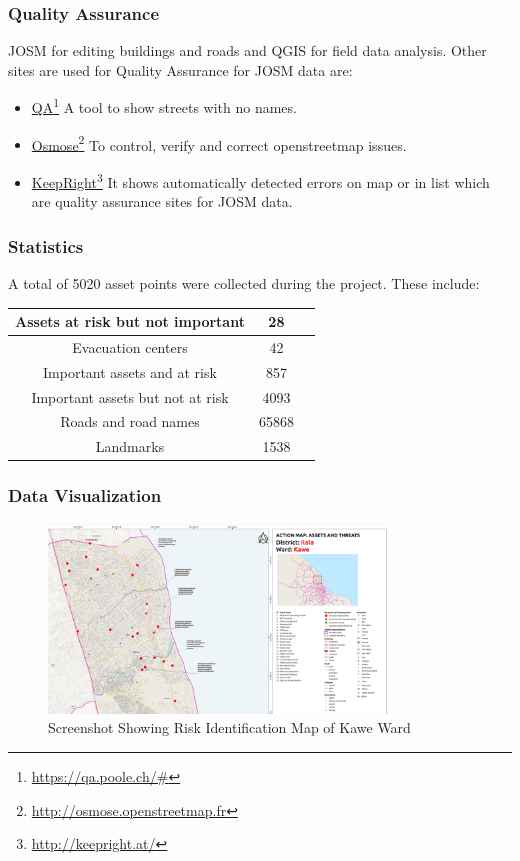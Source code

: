 \documentclass[a4paper,12pt,twoside]{article}
\begin{document}
\subsubsection{Quality Assurance}
JOSM for editing buildings and roads and QGIS for field data analysis. Other sites are used for Quality Assurance for JOSM data are:
\begin{itemize}
    \item \href{https://qa.poole.ch/\#}{QA}\footnote{\url{https://qa.poole.ch/\#}}
    A tool to show streets with no names.

    \item \href{http://osmose.openstreetmap.fr}{Osmose}\footnote{\url{http://osmose.openstreetmap.fr}}
    To  control, verify and correct openstreetmap issues.

    \item \href{http://keepright.at/}{KeepRight}\footnote{\url{http://keepright.at/}}
    It shows automatically detected errors on map or in  list    which are quality assurance sites for JOSM data.

\end{itemize}

\subsubsection{Statistics}
A total of 5020 asset points were collected during the project. These include:
\begin{center}
\begin{tabular}{ |c|c|c| }
 \hline
 Assets at risk but not important & 28 \\ 
 \hline
 Evacuation centers & 42 \\ 
 \hline
 Important assets and at risk & 857 \\
 \hline
 Important assets but not at risk & 4093 \\
 \hline
 Roads and road names & 65868 \\
 \hline
 Landmarks & 1538 \\
 \hline
\end{tabular}
\end{center}

\subsubsection{Data Visualization}
\begin{figure}[h]
{\color{RHgreen}\caption{Screenshot Showing Risk Identification Map of Kawe Ward }}
 \centering
  \includegraphics[width=0.8\textwidth]{images/Asset_and_Threat_Data_Viz.png}
\end{figure}
\end{document}
